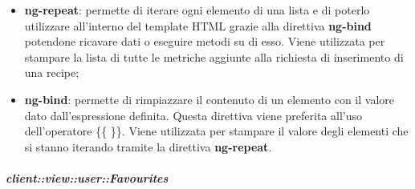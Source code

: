 \begin{itemize}
\begin{itemize}
						\item \textbf{ng-repeat}: permette di iterare ogni elemento di una lista e di poterlo utilizzare all'interno del template HTML grazie alla direttiva \textbf{ng-bind} potendone ricavare dati o eseguire metodi su di esso. Viene utilizzata per stampare la lista di tutte le metriche aggiunte alla richiesta di inserimento di una recipe;
						\item \textbf{ng-bind}: permette di rimpiazzare il contenuto di un elemento con il valore dato dall'espressione definita. Questa direttiva viene preferita all'uso dell'operatore \{\{ \}\}. Viene utilizzata per stampare il valore degli elementi che si stanno iterando tramite la direttiva \textbf{ng-repeat}.
					\end{itemize}
			\end{itemize}

		\subparagraph{client::view::user::Favourites} %
		\label{subp:bdsm_app_client_view_user_favourites}

